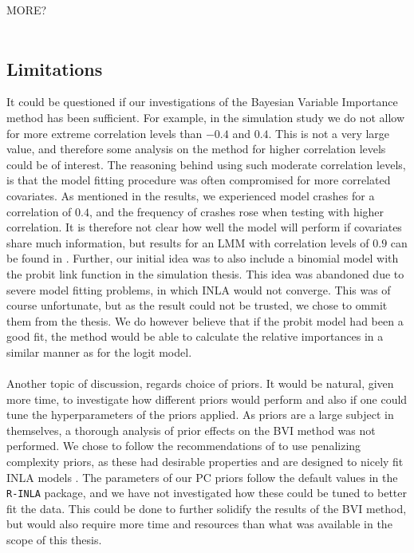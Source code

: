 MORE?
\\
\\
\subsection*{Limitations}
It could be questioned if our investigations of the Bayesian Variable Importance method has been sufficient. For example, in the simulation study we do not allow for more extreme correlation levels than $-0.4$ and $0.4$. This is not a very large value, and therefore some analysis on the method for higher correlation levels could be of interest. The reasoning behind using such moderate correlation levels, is that the model fitting procedure was often compromised for more correlated covariates. As mentioned in the results, we experienced model crashes for a correlation of $0.4$, and the frequency of crashes rose when testing with higher correlation. It is therefore not clear how well the model will perform if covariates share much information, but results for an LMM with correlation levels of $0.9$ can be found in \citet{Arnstad:Relative_variable_importance_in_Bayesian_linear_mixed_models:2024}. Further, our initial idea was to also include a binomial model with the probit link function in the simulation thesis. This idea was abandoned due to severe model fitting problems, in which INLA would not converge. This was of course unfortunate, but as the result could not be trusted, we chose to ommit them from the thesis. We do however believe that if the probit model had been a good fit, the method would be able to calculate the relative importances in a similar manner as for the logit model.
\\
\\
Another topic of discussion, regards choice of priors. It would be natural, given more time, to investigate how different priors would perform and also if one could tune the hyperparameters of the priors applied. As priors are a large subject in themselves, a thorough analysis of prior effects on the BVI method was not performed. We chose to follow the recommendations of \citet{simpson2017penalising} to use penalizing complexity priors, as these had desirable properties and are designed to nicely fit INLA models \citep{simpson2017penalising}. The parameters of our PC priors follow the default values in the \texttt{R-INLA} package, and we have not investigated how these could be tuned to better fit the data. This could be done to further solidify the results of the BVI method, but would also require more time and resources than what was available in the scope of this thesis. 
